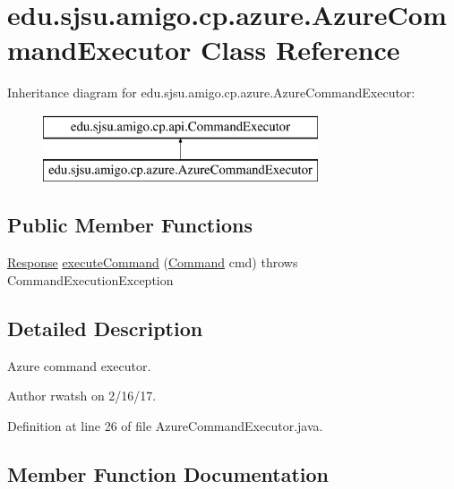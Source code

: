 \hypertarget{classedu_1_1sjsu_1_1amigo_1_1cp_1_1azure_1_1_azure_command_executor}{}\section{edu.\+sjsu.\+amigo.\+cp.\+azure.\+Azure\+Command\+Executor Class Reference}
\label{classedu_1_1sjsu_1_1amigo_1_1cp_1_1azure_1_1_azure_command_executor}
Inheritance diagram for edu.\+sjsu.\+amigo.\+cp.\+azure.\+Azure\+Command\+Executor\+:\begin{figure}[H]
\begin{center}
\leavevmode
\includegraphics[height=2.000000cm]{classedu_1_1sjsu_1_1amigo_1_1cp_1_1azure_1_1_azure_command_executor}
\end{center}
\end{figure}
\subsection*{Public Member Functions}
\begin{DoxyCompactItemize}
\item 
\hyperlink{classedu_1_1sjsu_1_1amigo_1_1cp_1_1api_1_1_response}{Response} \hyperlink{classedu_1_1sjsu_1_1amigo_1_1cp_1_1azure_1_1_azure_command_executor_abc6031fa5814897ec7fbacd40ac93866}{execute\+Command} (\hyperlink{classedu_1_1sjsu_1_1amigo_1_1cp_1_1api_1_1_command}{Command} cmd)  throws Command\+Execution\+Exception 
\end{DoxyCompactItemize}


\subsection{Detailed Description}
Azure command executor.

\begin{DoxyAuthor}{Author}
rwatsh on 2/16/17. 
\end{DoxyAuthor}


Definition at line 26 of file Azure\+Command\+Executor.\+java.



\subsection{Member Function Documentation}
\mbox{\label{classedu_1_1sjsu_1_1amigo_1_1cp_1_1azure_1_1_azure_command_executor_abc6031fa5814897ec7fbacd40ac93866}} 
